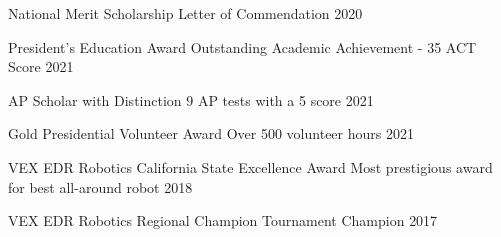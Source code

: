 




\begin{cvhonors}


\cvhonor
{National Merit Scholarship} %
{Letter of Commendation} %
{} %
{2020} %


\cvhonor
{President's Education Award} %
{Outstanding Academic Achievement - 35 ACT Score} %
{} %
{2021} %


\cvhonor
{AP Scholar with Distinction} %
{9 AP tests with a 5 score} %
{} %
{2021} %





\end{cvhonors}




\begin{cvhonors}


\cvhonor
{Gold Presidential Volunteer Award} %
{Over 500 volunteer hours} %
{} %
{2021} %


\cvhonor
{VEX EDR Robotics California State Excellence Award} %
{Most prestigious award for best all-around robot} %
{} %
{2018} %




\cvhonor
{VEX EDR Robotics Regional Champion} %
{Tournament Champion} %
{} %
{2017} %

\end{cvhonors}